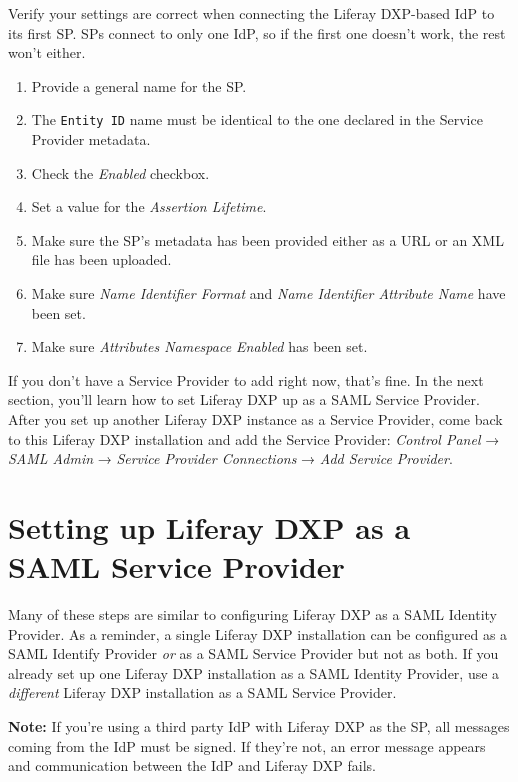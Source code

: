 Verify your settings are correct when connecting the Liferay DXP-based
IdP to its first SP. SPs connect to only one IdP, so if the first one
doesn't work, the rest won't either.

\begin{enumerate}
\def\labelenumi{\arabic{enumi}.}
\item
  Provide a general name for the SP.
\item
  The \texttt{Entity\ ID} name must be identical to the one declared in
  the Service Provider metadata.
\item
  Check the \emph{Enabled} checkbox.
\item
  Set a value for the \emph{Assertion Lifetime}.
\item
  Make sure the SP's metadata has been provided either as a URL or an
  XML file has been uploaded.
\item
  Make sure \emph{Name Identifier Format} and \emph{Name Identifier
  Attribute Name} have been set.
\item
  Make sure \emph{Attributes Namespace Enabled} has been set.
\end{enumerate}

If you don't have a Service Provider to add right now, that's fine. In
the next section, you'll learn how to set Liferay DXP up as a SAML
Service Provider. After you set up another Liferay DXP instance as a
Service Provider, come back to this Liferay DXP installation and add the
Service Provider: \emph{Control Panel} → \emph{SAML Admin} →
\emph{Service Provider Connections} → \emph{Add Service Provider}.

\section{Setting up Liferay DXP as a SAML Service
Provider}\label{setting-up-liferay-dxp-as-a-saml-service-provider}

Many of these steps are similar to configuring Liferay DXP as a SAML
Identity Provider. As a reminder, a single Liferay DXP installation can
be configured as a SAML Identify Provider \emph{or} as a SAML Service
Provider but not as both. If you already set up one Liferay DXP
installation as a SAML Identity Provider, use a \emph{different} Liferay
DXP installation as a SAML Service Provider.

\noindent\hrulefill

\textbf{Note:} If you're using a third party IdP with Liferay DXP as the
SP, all messages coming from the IdP must be signed. If they're not, an
error message appears and communication between the IdP and Liferay DXP
fails.

